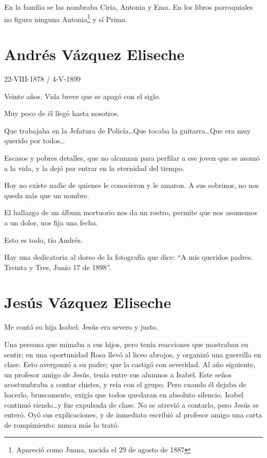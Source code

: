 \documentclass[a4paper]{article}
\begin{document}
En la familia se las nombraba Ciria, Antonia y Ema. En los libros parroquiales no figura ninguna Antonia\footnote{Apareció como Juana, nacida el 29 de agosto de 1887} y sí Prima.

\section{Andrés Vázquez Eliseche}

22-VIII-1878 / 4-V-1899

\bigbreak{}

Veinte años. Vida breve que se apagó con el siglo.

Muy poco de él llegó hasta nosotros.

Que trabajaba en la Jefatura de Policía\ldots Que tocaba la guitarra\ldots Que era muy querido por todos\ldots

Escasos y pobres detalles, que no alcanzan para perfilar a ese joven que se asomó a la vida, y la dejó par entrar en la eternidad del tiempo.

Hoy no existe nadie de quienes le conocieron y le amaron. A sus sobrinos, no nos queda más que un nombre.

El hallazgo de un álbum mortuorio nos da un rostro, permite que nos asomemos a un dolor, nos fija una fecha.

Esto es todo, tío Andrés.

Hay una dedicatoria al dorso de la fotografía que dice: ``A mis queridos padres. Treinta y Tres, Junio 17 de 1898''.

\section{Jesús Vázquez Eliseche}

Me contó su hija Isabel: Jesús era severo y justo.\ 

Una persona que mimaba a sus hijos, pero tenía reacciones que mostraban su sentir; en una oportunidad Rosa llevó al liceo abrojos, y organizó una guerrilla en clase. Esto avergonzó a su padre; que la castigó con severidad. Al año siguiente, un profesor amigo de Jesús, tenía entre sus alumnos a Isabel. Este seños acostumbraba a contar chistes, y reía con el grupo. Pero cuando él dejaba de hacerlo, bruscamente, exigía que todos quedaran en absoluto silencio. Isabel continuó riendo\ldots y fue expulsada de clase. No se atrevió a contarlo, pero Jesús se enteró. Oyó sus explicaciones, y de inmediato escribió al profesor amigo una carta de rompimiento: nunca más lo trató.
\end{document}
